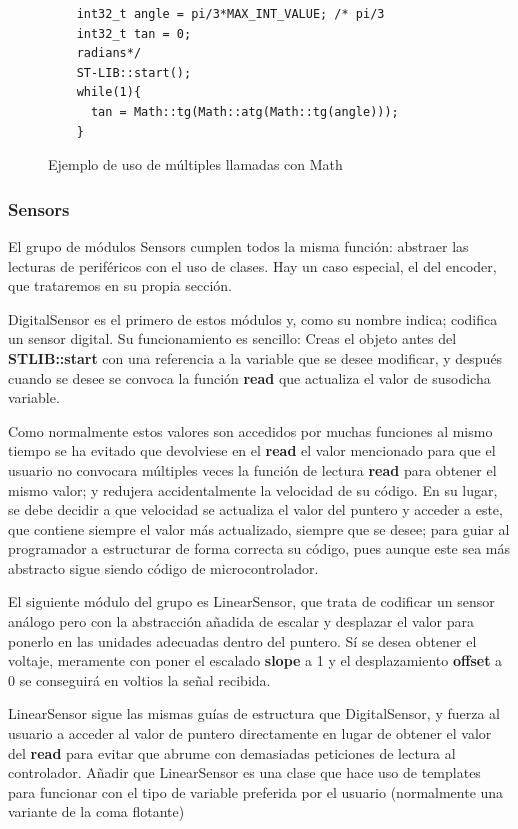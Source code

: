 \documentclass{report}
\begin{document}
\begin{figure}[H]
  \begin{lstlisting}
    int32_t angle = pi/3*MAX_INT_VALUE; /* pi/3 
    int32_t tan = 0;
    radians*/
    ST-LIB::start();
    while(1){
      tan = Math::tg(Math::atg(Math::tg(angle)));
    }
  \end{lstlisting}
  \caption{Ejemplo de uso de múltiples llamadas con Math}
  \label{MathNestedCode}
\end{figure}

\subsubsection{Sensors}
El grupo de módulos Sensors cumplen todos la misma función: abstraer las lecturas de periféricos con el uso de clases. Hay un caso especial, el del encoder, que trataremos en su propia sección. 
\par \vspace{0.3cm}
DigitalSensor es el primero de estos módulos y, como su nombre indica; codifica un sensor digital. Su funcionamiento es sencillo: Creas el objeto antes del \textbf{STLIB::start} con una referencia a la variable que se desee modificar, y después cuando se desee se convoca la función \textbf{read} que actualiza el valor de susodicha variable. \par
Como normalmente estos valores son accedidos por muchas funciones al mismo tiempo se ha evitado que devolviese en el \textbf{read} el valor mencionado para que el usuario no convocara múltiples veces la función de lectura \textbf{read} para obtener el mismo valor; y redujera accidentalmente la velocidad de su código. En su lugar, se debe decidir a que velocidad se actualiza el valor del puntero y acceder a este, que contiene siempre el valor más actualizado, siempre que se desee; para guiar al programador a estructurar de forma correcta su código, pues aunque este sea más abstracto sigue siendo código de microcontrolador. 
\par \vspace{0.3cm}
El siguiente módulo del grupo es LinearSensor, que trata de codificar un sensor análogo pero con la abstracción añadida de escalar y desplazar el valor para ponerlo en las unidades adecuadas dentro del puntero. Sí se desea obtener el voltaje, meramente con poner el escalado \textbf{slope} a 1 y el desplazamiento \textbf{offset} a 0 se conseguirá en voltios la señal recibida. \par
LinearSensor sigue las mismas guías de estructura que DigitalSensor, y fuerza al usuario a acceder al valor de puntero directamente en lugar de obtener el valor del \textbf{read} para evitar que abrume con demasiadas peticiones de lectura al controlador. Añadir que LinearSensor es una clase que hace uso de templates para funcionar con el tipo de variable preferida por el usuario (normalmente una variante de la coma flotante)
\end{document}
